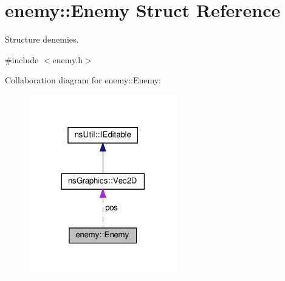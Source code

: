 \hypertarget{structenemy_1_1_enemy}{}\section{enemy\+:\+:Enemy Struct Reference}
\label{structenemy_1_1_enemy}


Structure d\textquotesingle{}enemies.  




{\ttfamily \#include $<$enemy.\+h$>$}



Collaboration diagram for enemy\+:\+:Enemy\+:
\nopagebreak
\begin{figure}[H]
\begin{center}
\leavevmode
\includegraphics[width=182pt]{structenemy_1_1_enemy__coll__graph}
\end{center}
\end{figure}
